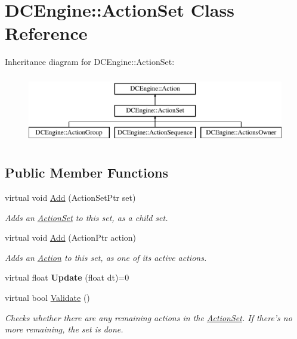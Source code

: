 \hypertarget{classDCEngine_1_1ActionSet}{\section{D\-C\-Engine\-:\-:Action\-Set Class Reference}
\label{classDCEngine_1_1ActionSet}
}
Inheritance diagram for D\-C\-Engine\-:\-:Action\-Set\-:\begin{figure}[H]
\begin{center}
\leavevmode
\includegraphics[height=3.000000cm]{classDCEngine_1_1ActionSet}
\end{center}
\end{figure}
\subsection*{Public Member Functions}
\begin{DoxyCompactItemize}
\item 
virtual void \hyperlink{classDCEngine_1_1ActionSet_a5e63f68a0161b788d218ca5f5bcbe0bd}{Add} (Action\-Set\-Ptr set)
\begin{DoxyCompactList}\small\item\em Adds an \hyperlink{classDCEngine_1_1ActionSet}{Action\-Set} to this set, as a child set. \end{DoxyCompactList}\item 
virtual void \hyperlink{classDCEngine_1_1ActionSet_ad8b8b1480f6f99da48b5b5d4188eaac9}{Add} (Action\-Ptr action)
\begin{DoxyCompactList}\small\item\em Adds an \hyperlink{classDCEngine_1_1Action}{Action} to this set, as one of its active actions. \end{DoxyCompactList}\item 
\hypertarget{classDCEngine_1_1ActionSet_aa231dcf08d43ad1ebad7aaa7fe1b420f}{virtual float {\bfseries Update} (float dt)=0}\label{classDCEngine_1_1ActionSet_aa231dcf08d43ad1ebad7aaa7fe1b420f}

\item 
\hypertarget{classDCEngine_1_1ActionSet_afa7f0f31e3d469c0696cc74aa1e534f4}{virtual bool \hyperlink{classDCEngine_1_1ActionSet_afa7f0f31e3d469c0696cc74aa1e534f4}{Validate} ()}\label{classDCEngine_1_1ActionSet_afa7f0f31e3d469c0696cc74aa1e534f4}

\begin{DoxyCompactList}\small\item\em Checks whether there are any remaining actions in the \hyperlink{classDCEngine_1_1ActionSet}{Action\-Set}. If there's no more remaining, the set is done. \end{DoxyCompactList}\end{DoxyCompactItemize}
